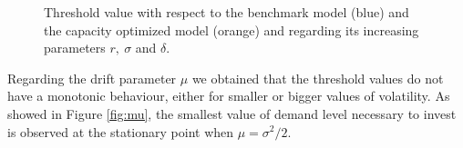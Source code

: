 \begin{figure}[!htb]
	\begin{subfigmatrix}{3}
	\end{subfigmatrix}
			\caption{Threshold value with respect to the benchmark model (blue) and the capacity optimized model (orange) and regarding its increasing parameters $r, \ \sigma$ and $\delta$.}
			\label{fig:sigm}
\end{figure}

Regarding the drift parameter $\mu$ we obtained that the threshold values do not have a monotonic behaviour, either for smaller or bigger values of volatility. As showed in Figure \ref{fig:mu}, the smallest value of demand level necessary to invest is observed at the stationary point when $\mu=\sigma^2/2$.

